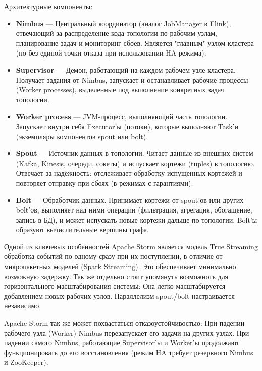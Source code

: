             
            Архитектурные компоненты:
            \begin{itemize}
                \item \textbf{Nimbus} — Центральный координатор (аналог JobManager в Flink), отвечающий за распределение кода топологии по рабочим узлам, планирование задач и мониторинг сбоев. Является "главным" узлом кластера (но без единой точки отказа при использовании HA-режима).
                \item \textbf{Supervisor} — Демон, работающий на каждом рабочем узле кластера. Получает задания от Nimbus, запускает и останавливает рабочие процессы (Worker processes), выделенные под выполнение конкретных задач топологии.
                \item \textbf{Worker process} — JVM-процесс, выполняющий часть топологии. Запускает внутри себя Executor'ы (потоки), которые выполняют Task'и (экземпляры компонентов spout или bolt).
                \item \textbf{Spout} — Источник данных в топологии. Читает данные из внешних систем (Kafka, Kinesis, очереди, сокеты) и испускает кортежи (tuples) в топологию. Отвечает за надёжность: отслеживает обработку испущенных кортежей и повторяет отправку при сбоях (в режимах с гарантиями).
                \item \textbf{Bolt} — Обработчик данных. Принимает кортежи от spout'ов или других bolt'ов, выполняет над ними операции (фильтрация, агрегация, обогащение, запись в БД), и может испускать новые кортежи дальше по топологии. Bolt'ы образуют вычислительные вершины графа.
            \end{itemize}
            
                
            Одной из ключевых особенностей Apache Storm является модель True Streaming обработка событий по одному сразу при их поступлении, в отличие от микропакетных моделей (Spark Streaming). Это обеспечивает минимально возможную задержку. Так же отдельно стоит упомянуть возможноть для горизонтального масштабирования системы: Она легко масштабируется добавлением новых рабочих узлов. Параллелизм spout/bolt настраивается независимо.
            
            
            Apache Storm так же может похвастаться отказоустойчивостью: При падении рабочего узла (Worker) Nimbus перезапускает его задачи на других узлах. При падении самого Nimbus, работающие Supervisor'ы и Worker'ы продолжают функционировать до его восстановления (режим HA требует резервного Nimbus и ZooKeeper).
            

